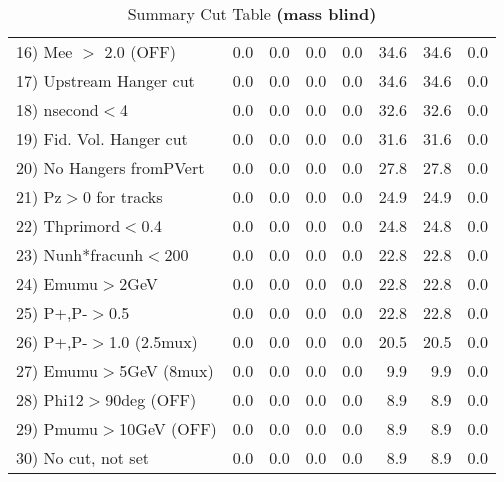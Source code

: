 \begin{table}[h!]
{{\begin{tabular}{||l||r|r|r|r|r||r||r||}
 16) Mee $>$ 2.0  (OFF)   &       0.0 &       0.0 &       0.0 &       0.0 &      34.6 &      34.6 &       0.0 \\
 17) Upstream Hanger cut  &       0.0 &       0.0 &       0.0 &       0.0 &      34.6 &      34.6 &       0.0 \\
 18) nsecond$<$4          &       0.0 &       0.0 &       0.0 &       0.0 &      32.6 &      32.6 &       0.0 \\
 19) Fid. Vol. Hanger cut &       0.0 &       0.0 &       0.0 &       0.0 &      31.6 &      31.6 &       0.0 \\
 20) No Hangers fromPVert &       0.0 &       0.0 &       0.0 &       0.0 &      27.8 &      27.8 &       0.0 \\
 21) Pz$>$0 for tracks    &       0.0 &       0.0 &       0.0 &       0.0 &      24.9 &      24.9 &       0.0 \\
 22) Thprimord$<$0.4      &       0.0 &       0.0 &       0.0 &       0.0 &      24.8 &      24.8 &       0.0 \\
 23) Nunh*fracunh$<$200   &       0.0 &       0.0 &       0.0 &       0.0 &      22.8 &      22.8 &       0.0 \\
 24) Emumu$>$2GeV         &       0.0 &       0.0 &       0.0 &       0.0 &      22.8 &      22.8 &       0.0 \\
 25) P+,P-$>$0.5          &       0.0 &       0.0 &       0.0 &       0.0 &      22.8 &      22.8 &       0.0 \\
 26) P+,P-$>$1.0 (2.5mux) &       0.0 &       0.0 &       0.0 &       0.0 &      20.5 &      20.5 &       0.0 \\
 27) Emumu$>$5GeV  (8mux) &       0.0 &       0.0 &       0.0 &       0.0 &       9.9 &       9.9 &       0.0 \\
 28) Phi12$>$90deg  (OFF) &       0.0 &       0.0 &       0.0 &       0.0 &       8.9 &       8.9 &       0.0 \\
 29) Pmumu$>$10GeV  (OFF) &       0.0 &       0.0 &       0.0 &       0.0 &       8.9 &       8.9 &       0.0 \\
 30) No cut, not set      &       0.0 &       0.0 &       0.0 &       0.0 &       8.9 &       8.9 &       0.0 \\
 \hline
 \hline
 \end{tabular}
 \caption{Summary Cut Table \textbf{ (mass blind)}}
 \label{tab-sumcut}
 }}
 \end{table}
 \endinput
